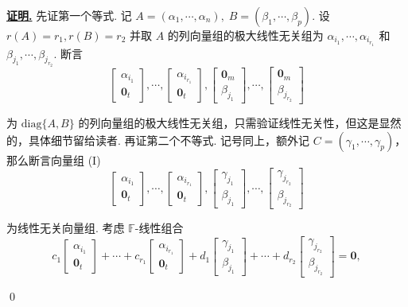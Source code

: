 \documentclass[10pt,openany]{article}
\theoremstyle{thmstyle} %
\theoremstyle{defstyle} %
\theoremstyle{prostyle} %
\theoremstyle{exastyle}
\theoremstyle{remstyle}
\renewenvironment{proof}[1][证明]{\par\underline{\textbf{#1.}} \;\fangsong}{\qed\par}
\newcommand{\F}{\mathbb{F}}
\newcommand{\diag}{\mathrm{diag}}
\begin{document}
\begin{proof}
	先证第一个等式. 记 \( A=(\alpha_1,\cdots,\alpha_n), \; B=(\beta_1,\cdots,\beta_p) \). 设 \( r(A)=r_1, r(B)=r_2 \) 并取 \( A \) 的列向量组的极大线性无关组为 \( \alpha_{i_1},\cdots,\alpha_{i_{r_1}} \) 和 \( \beta_{j_1},\cdots,\beta_{j_{r_2}} \). 断言
	\[ \begin{bmatrix}
		\alpha_{i_1} \\
		\bm{0}_{t}
	\end{bmatrix}, \cdots, \begin{bmatrix}
	\alpha_{i_{r_1}} \\
	\bm{0}_{t}
	\end{bmatrix}, \begin{bmatrix}
	\bm{0}_{m} \\
	\beta_{j_1}
	\end{bmatrix}, \cdots, \begin{bmatrix}
	\bm{0}_{m} \\
	\beta_{j_{r_2}}
	\end{bmatrix} \]
	
	为 \( \diag\{A,B\} \) 的列向量组的极大线性无关组，只需验证线性无关性，但这是显然的，具体细节留给读者. 再证第二个不等式. 记号同上，额外记 \( C=(\gamma_1,\cdots,\gamma_p) \)，那么断言向量组 (I)
	\[ \begin{bmatrix}
		\alpha_{i_1} \\
		\bm{0}_{t}
	\end{bmatrix}, \cdots, \begin{bmatrix}
		\alpha_{i_{r_1}} \\
		\bm{0}_{t}
	\end{bmatrix}, \begin{bmatrix}
		\gamma_{j_1} \\
		\beta_{j_1}
	\end{bmatrix}, \cdots, \begin{bmatrix}
		\gamma_{j_{r_2}} \\
		\beta_{j_{r_2}}
	\end{bmatrix} \]
	
	为线性无关向量组. 考虑 \( \F\)-线性组合
	\[ c_1\begin{bmatrix}
		\alpha_{i_1} \\
		\bm{0}_{t}
	\end{bmatrix}+\cdots+c_{r_1}\begin{bmatrix}
	\alpha_{i_{r_1}} \\
	\bm{0}_{t}
	\end{bmatrix}+d_1\begin{bmatrix}
	\gamma_{j_1} \\
	\beta_{j_1}
	\end{bmatrix}+\cdots+d_{r_2}\begin{bmatrix}
	\gamma_{j_{r_2}} \\
	\beta_{j_{r_2}}
	\end{bmatrix}= \bm{0},  \]
	

\end{proof}
\end{document}
